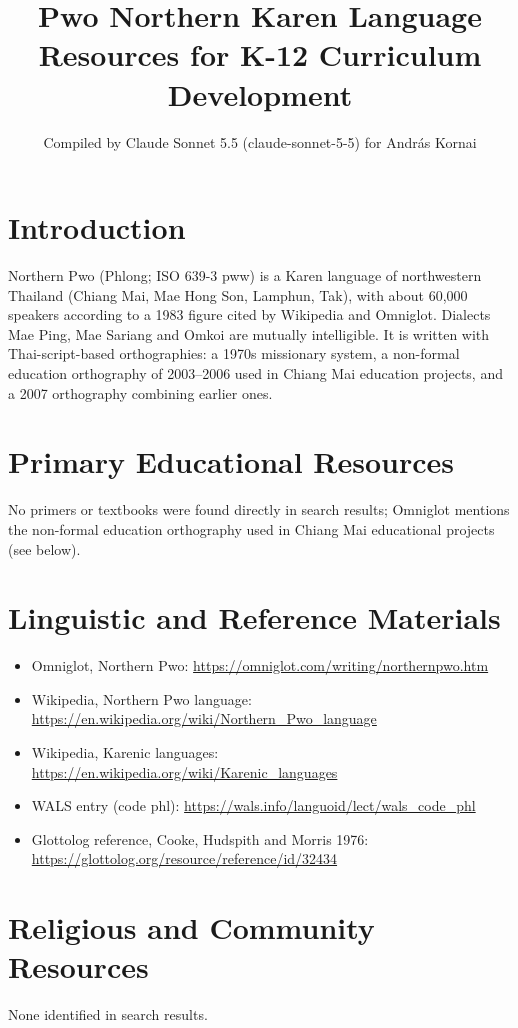 \documentclass[12pt]{article}
\title{Pwo Northern Karen Language Resources for K-12 Curriculum Development}
\author{Compiled by Claude Sonnet 5.5 (claude-sonnet-5-5) for Andr\'as Kornai}
\date{}
\begin{document}
\maketitle

\section{Introduction}
Northern Pwo (Phlong; ISO 639-3 pww) is a Karen language of northwestern Thailand (Chiang Mai, Mae Hong Son, Lamphun, Tak), with about 60,000 speakers according to a 1983 figure cited by Wikipedia and Omniglot. Dialects Mae Ping, Mae Sariang and Omkoi are mutually intelligible. It is written with Thai-script-based orthographies: a 1970s missionary system, a non-formal education orthography of 2003--2006 used in Chiang Mai education projects, and a 2007 orthography combining earlier ones.

\section{Primary Educational Resources}
No primers or textbooks were found directly in search results; Omniglot mentions the non-formal education orthography used in Chiang Mai educational projects (see below).

\section{Linguistic and Reference Materials}
\begin{itemize}
\item Omniglot, Northern Pwo: \url{https://omniglot.com/writing/northernpwo.htm}
\item Wikipedia, Northern Pwo language: \url{https://en.wikipedia.org/wiki/Northern_Pwo_language}
\item Wikipedia, Karenic languages: \url{https://en.wikipedia.org/wiki/Karenic_languages}
\item WALS entry (code phl): \url{https://wals.info/languoid/lect/wals_code_phl}
\item Glottolog reference, Cooke, Hudspith and Morris 1976: \url{https://glottolog.org/resource/reference/id/32434}
\end{itemize}

\section{Religious and Community Resources}
None identified in search results.
\end{document}
